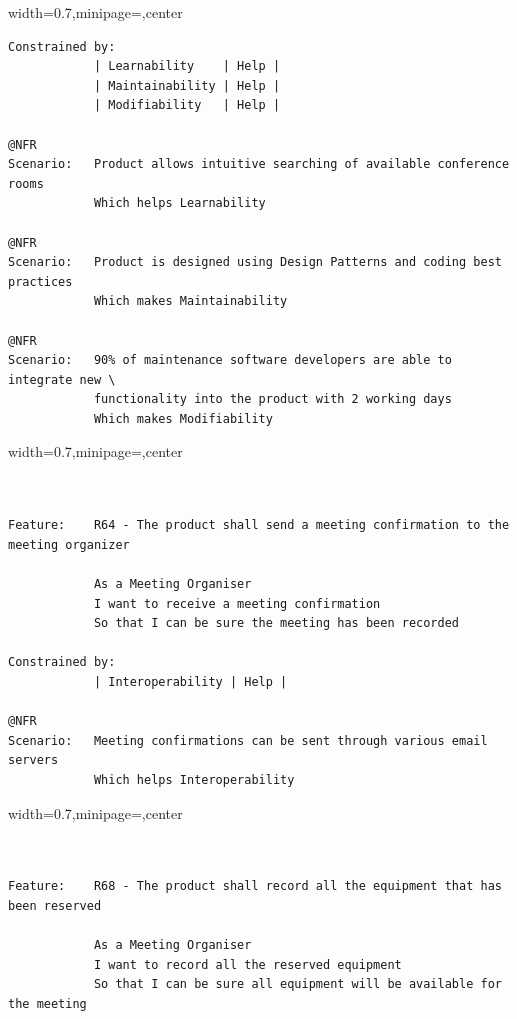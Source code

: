 \documentclass[dissertation,final]{softeng}
\newenvironment{featurecode}[1]
{ \lrbox\featurebox \begin{adjustbox}{width=#1\textwidth,minipage=\textwidth,center} }
{ \end{adjustbox}\endlrbox}
\newenvironment{featurelist}[2]
{
\newcommand{\setcaption}{\caption{#1}}
\newcommand{\setlabel}{\label{#2}}
}
{\begin{listing}[h!]\centering\usebox\featurebox\setcaption\setlabel\end{listing}}
\begin{document}
\begin{appendices}
\begin{featurelist}{R62 -- The product shall display a map of the company building}{lst:feature_r62}
\begin{featurecode}{0.7}
\begin{verbatim}
Constrained by:
            | Learnability    | Help |
            | Maintainability | Help |
            | Modifiability   | Help |

@NFR	
Scenario:   Product allows intuitive searching of available conference rooms
            Which helps Learnability
	
@NFR
Scenario:   Product is designed using Design Patterns and coding best practices
            Which makes Maintainability

@NFR
Scenario:   90% of maintenance software developers are able to integrate new \
            functionality into the product with 2 working days
            Which makes Modifiability
\end{verbatim}
\end{featurecode}
\end{featurelist}

\begin{featurelist}{R64 -- The product shall send a meeting confirmation to the meeting organizer}{lst:feature_r64}
\begin{featurecode}{0.7}
\begin{verbatim}


Feature:    R64 - The product shall send a meeting confirmation to the meeting organizer

            As a Meeting Organiser
            I want to receive a meeting confirmation
            So that I can be sure the meeting has been recorded
	
Constrained by:
            | Interoperability | Help |

@NFR	
Scenario:   Meeting confirmations can be sent through various email servers
            Which helps Interoperability
\end{verbatim}
\end{featurecode}
\end{featurelist}
\clearpage

\begin{featurelist}{R68 -- The product shall record all the equipment that has been reserved}{lst:feature_r68}
\begin{featurecode}{0.7}
\begin{verbatim}


Feature:    R68 - The product shall record all the equipment that has been reserved

            As a Meeting Organiser
            I want to record all the reserved equipment
            So that I can be sure all equipment will be available for the meeting
	

\end{verbatim}
\end{featurecode}
\end{featurelist}
\end{appendices}
\end{document}

